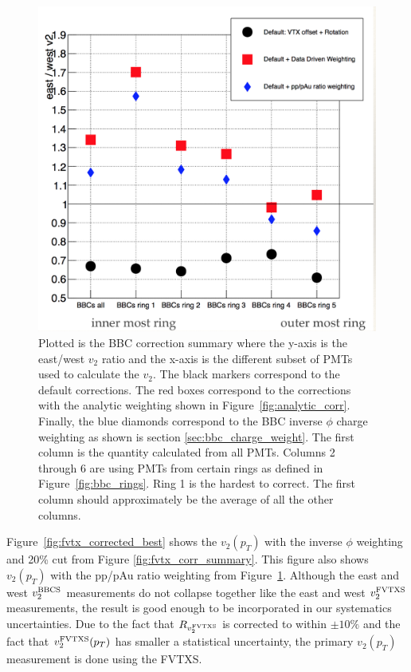 \begin{figure}[!h]
\begin{center}
\includegraphics[width=0.5\linewidth]{figs/bbc_correction_summary.png}
\caption{Plotted is the BBC correction summary where the y-axis is the east/west $v_2$ ratio and the x-axis is the different subset of PMTs used to calculate the $v_2$. The black markers correspond to the default corrections. The red boxes correspond to the corrections with the analytic weighting shown in Figure~\ref{fig:analytic_corr}. Finally, the blue diamonds correspond to the BBC inverse $\phi$ charge weighting as shown is section \ref{sec:bbc_charge_weight}. The first column is the quantity calculated from all PMTs. Columns 2 through 6 are using PMTs from certain rings as defined in Figure~\ref{fig:bbc_rings}. Ring 1 is the hardest to correct. The first column should approximately be the average of all the other columns.}
\label{fig:bbc_corr_summary}
\end{center}
\end{figure}

Figure~\ref{fig:fvtx_corrected_best} shows the $v_2(p_T)$ with the inverse $\phi$ weighting and 20\% cut from Figure \ref{fig:fvtx_corr_summary}. This figure also shows $v_2(p_T)$ with the pp/pAu ratio weighting from Figure~\ref{fig:bbc_corr_summary}. Although the east and west $v_2^{\rm BBCS}$ measurements do not collapse together like the east and west $v_2^{\rm FVTXS}$ measurements, the result is good enough to be incorporated in our systematics uncertainties. Due to the fact that $R_{v_2^{\rm FVTXS}}$ is corrected to within $\pm10\%$ and the fact that $v_2^{\rm FVTXS}(p_T)$ has smaller a statistical uncertainty, the primary $v_2(p_T)$ measurement is done using the FVTXS.

